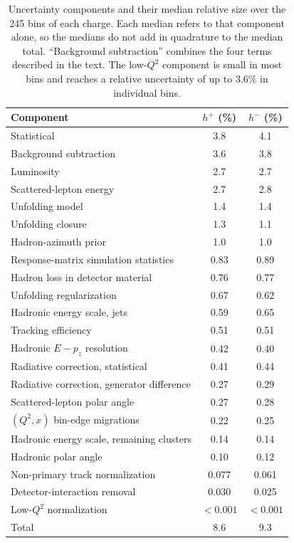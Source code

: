 \documentclass[11pt,a4paper]{article}
\newcommand{\Qsq}{Q^{2}}
\newcommand{\hplus}{h^{+}}
\newcommand{\hminus}{h^{-}}
\begin{document}
\begin{table}[t]
\centering
\caption{Uncertainty components and their median relative size over the 245 bins of each charge. Each median refers to that component alone, so the medians do not add in quadrature to the median total. ``Background subtraction'' combines the four terms described in the text. The low-$\Qsq$ component is small in most bins and reaches a relative uncertainty of up to 3.6\% in individual bins.}
\label{tab:syst}
\begin{tabular}{lcc}
\toprule
Component & $\hplus$ (\%) & $\hminus$ (\%) \\
\midrule
Statistical & 3.8 & 4.1 \\
Background subtraction & 3.6 & 3.8 \\
Luminosity & 2.7 & 2.7 \\
Scattered-lepton energy & 2.7 & 2.8 \\
Unfolding model & 1.4 & 1.4 \\
Unfolding closure & 1.3 & 1.1 \\
Hadron-azimuth prior & 1.0 & 1.0 \\
Response-matrix simulation statistics & 0.83 & 0.89 \\
Hadron loss in detector material & 0.76 & 0.77 \\
Unfolding regularization & 0.67 & 0.62 \\
Hadronic energy scale, jets & 0.59 & 0.65 \\
Tracking efficiency & 0.51 & 0.51 \\
Hadronic $E-p_{z}$ resolution & 0.42 & 0.40 \\
Radiative correction, statistical & 0.41 & 0.44 \\
Radiative correction, generator difference & 0.27 & 0.29 \\
Scattered-lepton polar angle & 0.27 & 0.28 \\
$(\Qsq,x)$ bin-edge migrations & 0.22 & 0.25 \\
Hadronic energy scale, remaining clusters & 0.14 & 0.14 \\
Hadronic polar angle & 0.10 & 0.12 \\
Non-primary track normalization & 0.077 & 0.061 \\
Detector-interaction removal & 0.030 & 0.025 \\
Low-$\Qsq$ normalization & $<0.001$ & $<0.001$ \\
\midrule
Total & 8.6 & 9.3 \\
\bottomrule
\end{tabular}
\end{table}
\end{document}
